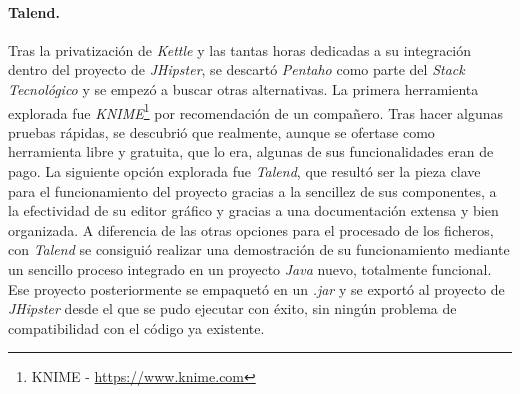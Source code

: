 \par
\paragraph*{Talend.}

\par
Tras la privatización de \textit{Kettle} y las tantas horas dedicadas a su integración dentro del proyecto de \textit{JHipster}, se descartó \textit{Pentaho} como parte del \textit{Stack Tecnológico} y se empezó a buscar otras alternativas. La primera herramienta explorada fue \textit{KNIME}\footnote{KNIME - \url{https://www.knime.com}} por recomendación de un compañero. Tras hacer algunas pruebas rápidas, se descubrió que realmente, aunque se ofertase como herramienta libre y gratuita, que lo era, algunas de sus funcionalidades eran de pago. La siguiente opción explorada fue \textit{Talend}, que resultó ser la pieza clave para el funcionamiento del proyecto gracias a la sencillez de sus componentes, a la efectividad de su editor gráfico y gracias a una documentación extensa y bien organizada. A diferencia de las otras opciones para el procesado de los ficheros, con \textit{Talend} se consiguió realizar una demostración de su funcionamiento mediante un sencillo proceso integrado en un proyecto \textit{Java} nuevo, totalmente funcional. Ese proyecto posteriormente se empaquetó en un \textit{.jar} y se exportó al proyecto de \textit{JHipster} desde el que se pudo ejecutar con éxito, sin ningún problema de compatibilidad con el código ya existente.  
	
